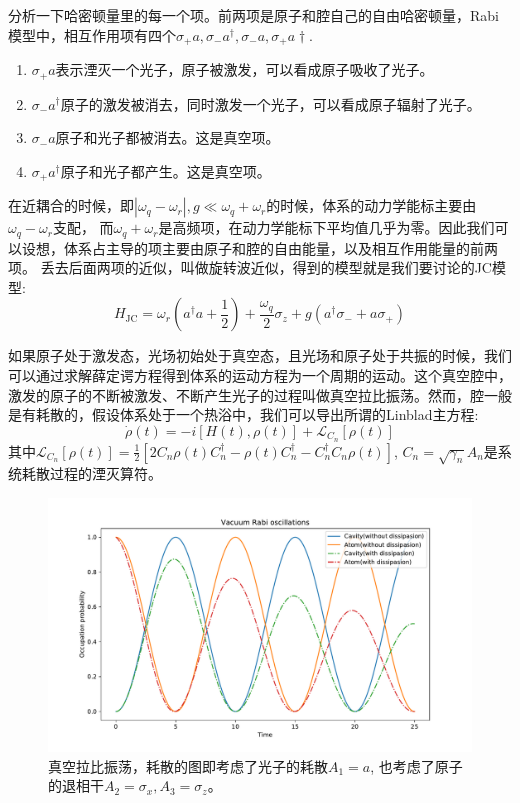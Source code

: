 \documentclass[supercite]{HustGraduPaper}
\begin{document}
	分析一下哈密顿量里的每一个项。前两项是原子和腔自己的自由哈密顿量，Rabi模型中，相互作用项有四个$\sigma_+ a, \sigma_- a^\dagger, \sigma_- a, \sigma_+ a\dagger$.
	\begin{enumerate}
		\item $\sigma_+ a$表示湮灭一个光子，原子被激发，可以看成原子吸收了光子。
		\item $\sigma_- a^\dagger$原子的激发被消去，同时激发一个光子，可以看成原子辐射了光子。
		\item $\sigma_- a$原子和光子都被消去。这是真空项。
		\item $\sigma_+ a^\dagger$原子和光子都产生。这是真空项。
	\end{enumerate}
	在近耦合的时候，即$|\omega_q - \omega_r|,g \ll \omega_q + \omega_r$的时候，体系的动力学能标主要由$\omega_q- \omega_r$支配，
	而$\omega_q + \omega_r$是高频项，在动力学能标下平均值几乎为零。因此我们可以设想，体系占主导的项主要由原子和腔的自由能量，以及相互作用能量的前两项。
	丢去后面两项的近似，叫做旋转波近似，得到的模型就是我们要讨论的JC模型\cite{you2011atomic}:
	\begin{equation}
		H_{\text{JC}} = \omega_r (a^\dagger a + \frac{1}{2}) + \frac{\omega_q}{2} \sigma_z + g(a^\dagger \sigma_- + a \sigma_+)
	\end{equation}
	
	如果原子处于激发态，光场初始处于真空态，且光场和原子处于共振的时候，我们可以通过求解薛定谔方程得到体系的运动方程为一个周期的运动。这个真空腔中，激发的原子的不断被激发、不断产生光子的过程叫做真空拉比振荡。然而，腔一般是有耗散的，假设体系处于一个热浴中，我们可以导出所谓的Linblad主方程\cite{gardiner2004quantum}:
	\begin{equation}
	\dot \rho(t) = -i[H(t),\rho(t)] + \mathcal{L}_{C_n}[\rho(t)]
	\end{equation}
	其中$\mathcal{L}_{C_n}[\rho(t)] = \frac{1}{2}[2C_n \rho(t)C_n^\dagger - \rho(t) C_n^\dagger - C_n^\dagger C_n \rho(t)]$, $C_n = \sqrt{\gamma_n} A_n$是系统耗散过程的湮灭算符。
\begin{figure}
	\centering
	\includegraphics[width=0.9\linewidth]{Figures/mine/VacuumRabos}
	\caption{真空拉比振荡，耗散的图即考虑了光子的耗散$A_1 = a$, 也考虑了原子的退相干$A_2 = \sigma_x, A_3 = \sigma_z$。}
	\label{fig:vacuumrabos}
\end{figure}
	
\end{document}
